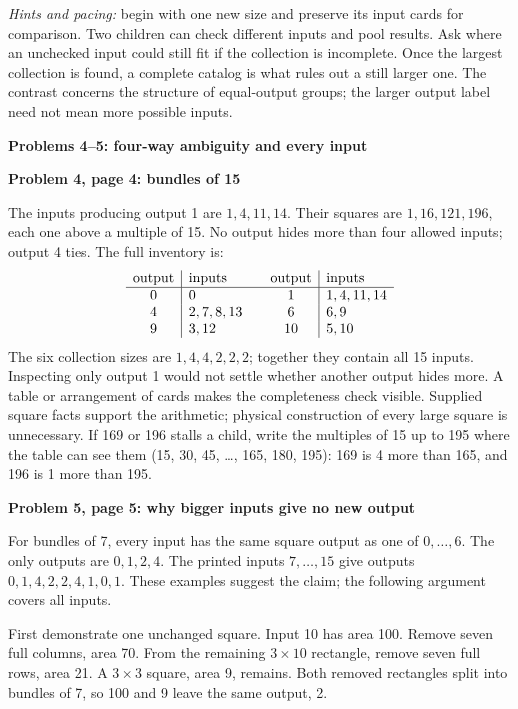 \documentclass[11pt]{article}
\newcommand{\head}[1]{\par\textbf{\large #1}\par}
\newcommand{\sub}[1]{\par\textbf{#1}\par}
\begin{document}
\emph{Hints and pacing:} begin with one new size and preserve its input cards for comparison. Two children can check different inputs and pool results. Ask where an unchecked input could still fit if the collection is incomplete. Once the largest collection is found, a complete catalog is what rules out a still larger one. The contrast concerns the structure of equal-output groups; the larger output label need not mean more possible inputs.
\newpage
\head{Problems 4--5: four-way ambiguity and every input}
\sub{Problem 4, page 4: bundles of 15}
The inputs producing output 1 are $1,4,11,14$. Their squares are $1,16,121,196$, each one above a multiple of 15. No output hides more than four allowed inputs; output 4 ties. The full inventory is:
\[
\begin{array}{c|l@{\qquad}c|l}
\text{output}&\text{inputs}&\text{output}&\text{inputs}\\\hline
0&0&1&1,4,11,14\\
4&2,7,8,13&6&6,9\\
9&3,12&10&5,10
\end{array}
\]
The six collection sizes are $1,4,4,2,2,2$; together they contain all 15 inputs. Inspecting only output 1 would not settle whether another output hides more. A table or arrangement of cards makes the completeness check visible. Supplied square facts support the arithmetic; physical construction of every large square is unnecessary. If 169 or 196 stalls a child, write the multiples of 15 up to 195 where the table can see them (15, 30, 45, \ldots, 165, 180, 195): 169 is 4 more than 165, and 196 is 1 more than 195.

\sub{Problem 5, page 5: why bigger inputs give no new output}
For bundles of 7, every input has the same square output as one of $0,\ldots,6$. The only outputs are $0,1,2,4$. The printed inputs $7,\ldots,15$ give outputs $0,1,4,2,2,4,1,0,1$. These examples suggest the claim; the following argument covers all inputs.

First demonstrate one unchanged square. Input 10 has area 100. Remove seven full columns, area 70. From the remaining $3\times10$ rectangle, remove seven full rows, area 21. A $3\times3$ square, area 9, remains. Both removed rectangles split into bundles of 7, so 100 and 9 leave the same output, 2.

\begin{center}
\end{center}
\end{document}

